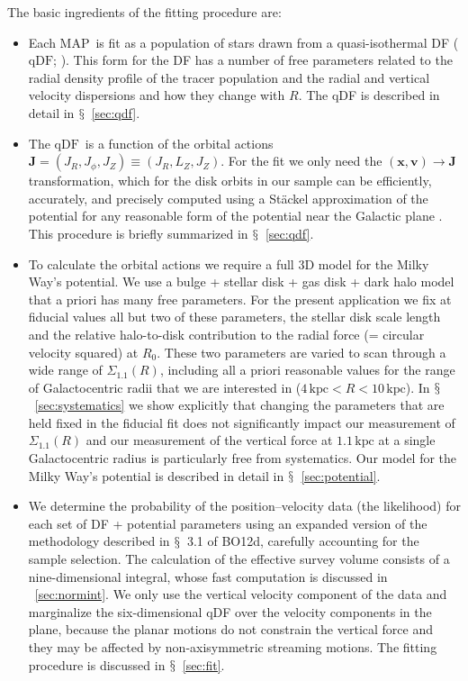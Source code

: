 \documentclass{emulateapj}
\newcommand{\sectionname}{$\mathsection$}
\renewcommand{\vec}[1]{\ensuremath{\mathbf{#1}}}
\newcommand{\vecx}{\ensuremath{\vec{x}}}
\newcommand{\vecv}{\ensuremath{\vec{v}}}
\newcommand{\vecj}{\ensuremath{\vec{J}}}
\newcommand{\qdf}{\ensuremath{\mathrm{qDF}}}
\newcommand{\map}{MAP}
\newcommand{\kpc}{\ensuremath{\,\mathrm{kpc}}}
\newcommand{\sigoneone}{\ensuremath{\Sigma_{1.1}}}
\newcommand{\jr}{\ensuremath{J_R}}
\newcommand{\jphi}{\ensuremath{J_\phi}}
\newcommand{\jz}{\ensuremath{J_Z}}
\newcommand{\lz}{\ensuremath{L_Z}}
\newcommand{\bo}{BO12}
\begin{document}
The basic ingredients of the fitting procedure are:
\begin{itemize}

\item Each \map\ is fit as a population of stars drawn from a
  quasi-isothermal DF (\qdf;
  \citealt{Binney10a,Binney11a,Ting13a}). This form for the DF has a
  number of free parameters related to the radial density profile of
  the tracer population and the radial and vertical velocity
  dispersions and how they change with $R$. The qDF is described in
  detail in \sectionname~\ref{sec:qdf}.

\item The \qdf\ is a function of the orbital actions $\vecj=(\jr,
  \jphi,\jz) \equiv (\jr,\lz,\jz)$. For the fit we only need the
  $(\vecx,\vecv) \rightarrow \vecj$ transformation, which for the disk
  orbits in our sample can be efficiently, accurately, and precisely
  computed using a St\"{a}ckel approximation of the potential for any
  reasonable form of the potential near the Galactic plane
  \citep{Binney12a}. This procedure is briefly summarized
  in \sectionname~\ref{sec:qdf}.

\item To calculate the orbital actions we require a full 3D model for
  the Milky Way's potential. We use a bulge + stellar disk + gas disk
  + dark halo model that a priori has many free parameters. For the
  present application we fix at fiducial values all but two of these
  parameters, the stellar disk scale length and the relative
  halo-to-disk contribution to the radial force (= circular velocity
  squared) at $R_0$. These two parameters are varied to scan through a
  wide range of $\sigoneone(R)$, including all a priori reasonable
  values for the range of Galactocentric radii that we are interested
  in ($4\kpc < R < 10\kpc$). In \sectionname~\ref{sec:systematics} we
  show explicitly that changing the parameters that are held fixed in
  the fiducial fit does not significantly impact our measurement of
  $\sigoneone(R)$ and our measurement of the vertical force at
  $1.1\kpc$ at a single Galactocentric radius is particularly free
  from systematics. Our model for the Milky Way's potential is
  described in detail in \sectionname~\ref{sec:potential}.

\item We determine the probability of the position--velocity data (the
  likelihood) for each set of DF + potential parameters using an
  expanded version of the methodology described in \sectionname~3.1 of
  \bo d, carefully accounting for the sample selection. The
  calculation of the effective survey volume consists of a
  nine-dimensional integral, whose fast computation is discussed in
  \appendixname~\ref{sec:normint}. We only use the vertical velocity
  component of the data and marginalize the six-dimensional qDF over
  the velocity components in the plane, because the planar motions do
  not constrain the vertical force and they may be affected by
  non-axisymmetric streaming motions. The fitting procedure is
  discussed in \sectionname~\ref{sec:fit}.


\end{itemize}
\end{document}

